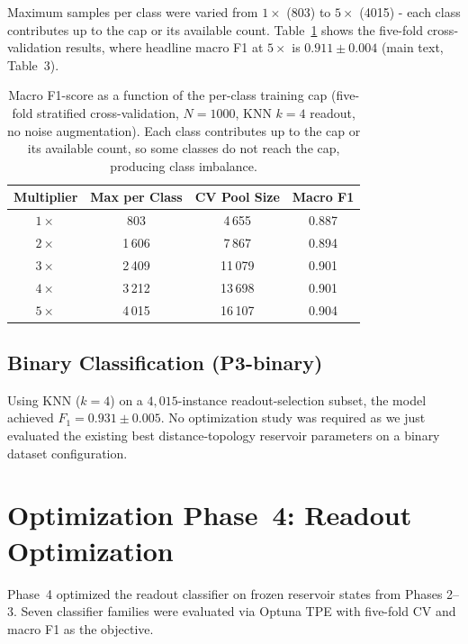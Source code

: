\documentclass[journal=asbcd6,manuscript=suppinfo]{achemso}
\begin{document}
Maximum samples per class were varied from $1\times$ (803) to $5\times$ (4015) - each class contributes up to the cap or its available count. 
Table~\ref{tab:imbalance-scaling-si} shows the five-fold cross-validation results, where headline macro F1 at $5\times$ is $0.911 \pm 0.004$ (main text, Table~3).

\begin{table}[H]
    \centering
    \caption{Macro F1-score as a function of the per-class training cap (five-fold stratified cross-validation, $N = 1000$, KNN $k = 4$ readout, no noise augmentation). Each class contributes up to the cap or its available count, so some classes do not reach the cap, producing class imbalance.}
    \label{tab:imbalance-scaling-si}
    \small
    \begin{tabular}{cccc}
        \toprule
        Multiplier & Max per Class & CV Pool Size & Macro F1 \\
        \midrule
        $1\times$ & 803 & 4\,655 & 0.887 \\
        $2\times$ & 1\,606 & 7\,867 & 0.894 \\
        $3\times$ & 2\,409 & 11\,079 & 0.901 \\
        $4\times$ & 3\,212 & 13\,698 & 0.901 \\
        $5\times$ & 4\,015 & 16\,107 & 0.904 \\
        \bottomrule
    \end{tabular}
\end{table}

\subsection{Binary Classification (P3-binary)}

Using KNN ($k = 4$) on a $4{,}015$-instance readout-selection subset, the model achieved $F_1 = 0.931 \pm 0.005$. No optimization study was required as we just evaluated the existing best distance-topology reservoir parameters on a binary dataset configuration.

\section{Optimization Phase~4: Readout Optimization}\label{sec:si-readout}

Phase~4 optimized the readout classifier on frozen reservoir states from Phases 2--3. 
Seven classifier families were evaluated via Optuna TPE with five-fold CV and macro F1 as the objective.
\end{document}
